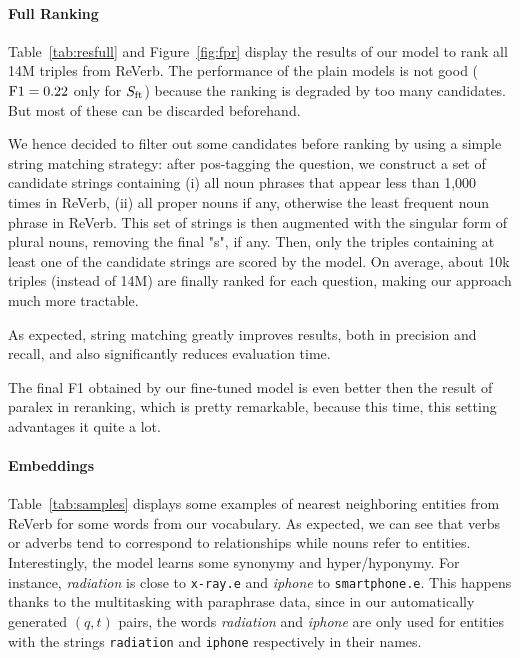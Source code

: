 \documentclass[runningheads,a4paper]{llncs}
\newcommand{\kb}[1]{{\small\texttt{#1}}\xspace}
\newcommand{\Sftv}{S_{{\rm ft}}}
\newcommand{\rv}{{\sc ReVerb}\xspace}
\begin{document}
\paragraph{Full Ranking}

Table~\ref{tab:resfull} and Figure~\ref{fig:fpr} display the results of our model to rank all 14M triples from \rv.
The performance of the plain models is not good (${\rm F1}=0.22$ only for $\Sftv$) because the ranking is degraded by too many candidates. 
But most of these can be discarded beforehand.

We hence decided to filter out some candidates before ranking by using a simple string matching strategy: 
after pos-tagging the question, we construct a set of candidate strings containing (i) all noun phrases that appear less than 1,000 times in \rv, (ii) all proper nouns if any, otherwise the least frequent noun phrase in \rv.
This set of strings is then augmented with the singular form of plural nouns, removing the final "s", if any. Then, only the triples containing at least one of the candidate strings are scored by the model. 
On average, about 10k triples (instead of 14M) are finally ranked for each question, making our approach much more tractable. 


As expected, string matching greatly improves results, both in precision and recall, and also significantly reduces evaluation time.  

The final F1 obtained by our fine-tuned model is even better then the result of {\sc paralex} in reranking, which is pretty remarkable, because this time, this setting advantages it quite a lot.


\paragraph{Embeddings}

Table~\ref{tab:samples} displays some examples of nearest neighboring entities from \rv for some words from our vocabulary.
As expected, we can see that verbs or adverbs tend to correspond to relationships while nouns refer to entities.
Interestingly, the model learns some synonymy and hyper/hyponymy. For instance,  {\it radiation} is close to \kb{x-ray.e} and {\it iphone} to \kb{smartphone.e}.
This happens thanks to the multitasking with paraphrase data, since in our automatically generated $(q, t)$ pairs, the words {\it radiation} and {\it iphone} are only used for entities with the strings \kb{radiation} and \kb{iphone} respectively in their names.
\end{document}
